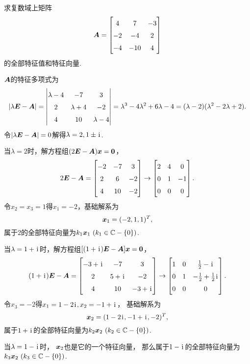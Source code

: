 \begin{example}
求复数域上矩阵\[
	\vb{A} = \begin{bmatrix}
		4 & 7 & -3 \\
		-2 & -4 & 2 \\
		-4 & -10 & 4
	\end{bmatrix}
\]的全部特征值和特征向量.
\begin{solution}
\(\boldsymbol{A}\)的特征多项式为\[
	\abs{\lambda\vb{E}-\vb{A}}
	= \begin{vmatrix}
		\lambda-4 & -7 & 3 \\
		2 & \lambda+4 & -2 \\
		4 & 10 & \lambda-4
	\end{vmatrix}
	= \lambda^3 - 4\lambda^2 + 6\lambda - 4
	= (\lambda-2)(\lambda^2-2\lambda+2).
\]
令\(\abs{\lambda\boldsymbol{E}-\boldsymbol{A}}=0\)解得\(\lambda=2,1\pm\kern1pt\mathrm{i}\kern1pt\).

当\(\lambda=2\)时，解方程组\((2\boldsymbol{E}-\boldsymbol{A})\boldsymbol{x}=\boldsymbol0\)，\[
	2\vb{E}-\vb{A} = \begin{bmatrix}
		-2 & -7 & 3 \\
		2 & 6 & -2 \\
		4 & 10 & -2
	\end{bmatrix} \to \begin{bmatrix}
		2 & 4 & 0 \\
		0 & 1 & -1 \\
		0 & 0 & 0
	\end{bmatrix}.
\]
令\(x_2=x_3=1\)得\(x_1=-2\)，基础解系为\[
	\boldsymbol{x}_1 = (-2,1,1)^T,
\]
属于\(2\)的全部特征向量为\(k_1\boldsymbol{x}_1\ (k_1\in\mathbb{C}-\{0\})\).

当\(\lambda=1+\kern1pt\mathrm{i}\kern1pt\)时，解方程组\([(1+\kern1pt\mathrm{i}\kern1pt)\boldsymbol{E}-\boldsymbol{A}]\boldsymbol{x}=\boldsymbol0\)，\[
	(1+\iu)\vb{E}-\vb{A} = \begin{bmatrix}
		-3+\iu & -7 & 3 \\
		2 & 5+\iu & -2 \\
		4 & 10 & -3+\iu
	\end{bmatrix}
	\to \def\arraystretch{1.5}\begin{bmatrix}
		1 & 0 & \frac{1}{2}-\iu \\
		0 & 1 & -\frac{1}{2}+\frac{1}{2}\iu \\
		0 & 0 & 0
	\end{bmatrix}.
\]
令\(x_3=-2\)得\(x_1=1-2\kern1pt\mathrm{i}\kern1pt,x_2=-1+\kern1pt\mathrm{i}\kern1pt\)，
基础解系为\[
	\boldsymbol{x}_2 = (1-2\kern1pt\mathrm{i}\kern1pt,-1+\kern1pt\mathrm{i}\kern1pt,-2)^T,
\]
属于\(1+\kern1pt\mathrm{i}\kern1pt\)的全部特征向量为\(k_2\boldsymbol{x}_2\ (k_2\in\mathbb{C}-\{0\})\).

当\(\lambda=1-\kern1pt\mathrm{i}\kern1pt\)时，
\(\boldsymbol{x}_2\)也是它的一个特征向量，
那么属于\(1-\kern1pt\mathrm{i}\kern1pt\)的全部特征向量为\(k_3\boldsymbol{x}_2\ (k_3\in\mathbb{C}-\{0\})\).
\end{solution}
\end{example}
